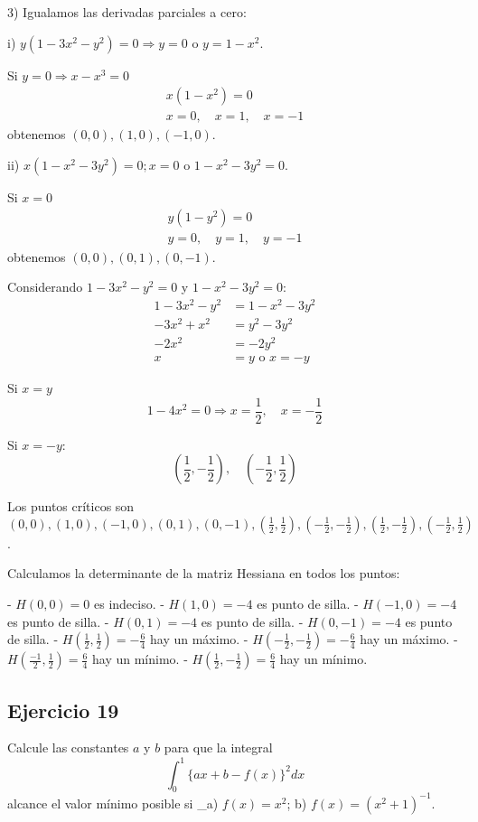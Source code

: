 \documentclass{report}
\begin{document}
3) Igualamos las derivadas parciales a cero:

i) $y(1 - 3 x^{2} - y^{2}) = 0 \Rightarrow y = 0$ o $y = 1 - x^{2}$.

Si $y = 0 \Rightarrow x - x^{3} = 0$
$$
\begin{gathered}
x(1 - x^{2}) = 0 \\
x = 0, \quad x = 1, \quad x = -1
\end{gathered}
$$
obtenemos $(0,0), (1,0), (-1,0)$.

ii) $x(1 - x^{2} - 3 y^{2}) = 0 ; x = 0$ o $1 - x^{2} - 3 y^{2} = 0$.

Si $x = 0$
$$
\begin{gathered}
y(1 - y^{2}) = 0 \\
y = 0, \quad y = 1, \quad y = -1
\end{gathered}
$$
obtenemos $(0,0), (0,1), (0,-1)$.

Considerando $1 - 3 x^{2} - y^{2} = 0$ y $1 - x^{2} - 3 y^{2} = 0$:
$$
\begin{aligned}
1 - 3 x^{2} - y^{2} &= 1 - x^{2} - 3 y^{2} \\
-3 x^{2} + x^{2} &= y^{2} - 3 y^{2} \\
-2 x^{2} &= -2 y^{2} \\
x &= y \text{ o } x = -y
\end{aligned}
$$

Si $x = y$ 
$$
1 - 4 x^{2} = 0 \Rightarrow x = \frac{1}{2}, \quad x = -\frac{1}{2}
$$

Si $x = -y$: 
$$
\left(\frac{1}{2}, -\frac{1}{2}\right), \quad \left(-\frac{1}{2}, \frac{1}{2}\right)
$$

Los puntos críticos son $(0,0), (1,0), (-1,0), (0,1), (0,-1), \left(\frac{1}{2}, \frac{1}{2}\right), \left(-\frac{1}{2}, -\frac{1}{2}\right), \left(\frac{1}{2}, -\frac{1}{2}\right), \left(-\frac{1}{2}, \frac{1}{2}\right)$.

Calculamos la determinante de la matriz Hessiana en todos los puntos: 

- $H(0,0) = 0$ es indeciso.
- $H(1,0) = -4$ es punto de silla.
- $H(-1,0) = -4$ es punto de silla.
- $H(0,1) = -4$ es punto de silla.
- $H(0,-1) = -4$ es punto de silla.
- $H\left(\frac{1}{2}, \frac{1}{2}\right) = -\frac{6}{4}$ hay un máximo. 
- $H\left(-\frac{1}{2}, -\frac{1}{2}\right) = -\frac{6}{4}$ hay un máximo. 
- $H\left(\frac{-1}{2}, \frac{1}{2}\right) = \frac{6}{4}$ hay un mínimo.
- $H\left(\frac{1}{2}, -\frac{1}{2}\right) = \frac{6}{4}$ hay un mínimo.\subsection{Ejercicio 19}
Calcule las constantes $a$ y $b$ para que la integral
$$
\int_{0}^{1}\{a x+b-f(x)\}^{2} d x
$$
alcance el valor mínimo posible si _a) $f(x)=x^{2}$; b) $f(x)=\left(x^{2}+1\right)^{-1}$.
\end{document}
